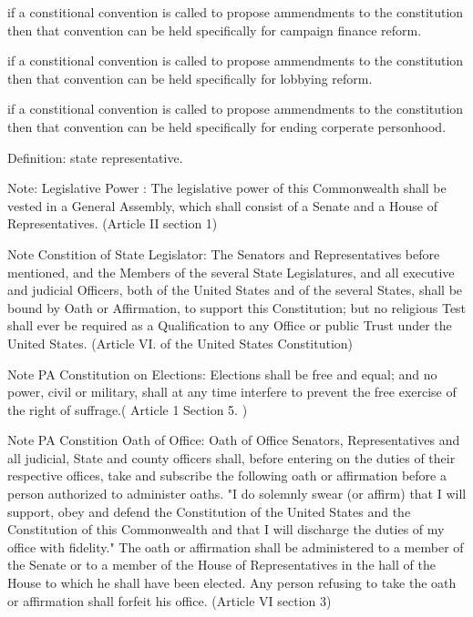 \documentclass[11pt]{article} %
\begin{document}
\begin{enumerate}
if a constitional convention is called to propose ammendments to the constitution then that convention can be held specifically for campaign finance reform.

if a constitional convention is called to propose ammendments to the constitution then that convention can be held specifically for lobbying reform.

if a constitional convention is called to propose ammendments to the constitution then that convention can be held specifically for ending corperate personhood.

Definition:  state representative.

Note: Legislative Power : The legislative power of this Commonwealth shall be vested in a General Assembly, which shall consist of a Senate and a House of Representatives. (Article II section 1)

Note Constition of State Legislator: The Senators and Representatives before mentioned, and the Members of the several State Legislatures, and all executive and judicial Officers, both of the United States and of the several States, shall be bound by Oath or Affirmation, to support this Constitution; but no religious Test shall ever be required as a Qualification to any Office or public Trust under the United States. (Article VI. of the United States Constitution)

Note PA Constitution on Elections: Elections shall be free and equal; and no power, civil or military, shall at any time interfere to prevent the free exercise of the right of suffrage.( Article 1 Section 5. )

Note PA Constition Oath of Office: Oath of Office  Senators, Representatives and all judicial, State and county officers shall, before entering on the duties of their respective offices, take and subscribe the following oath or affirmation before a person authorized to administer oaths. "I do solemnly swear (or affirm) that I will support, obey and defend the Constitution of the United States and the Constitution of this Commonwealth and that I will discharge the duties of my office with fidelity." The oath or affirmation shall be administered to a member of the Senate or to a member of the House of Representatives in the hall of the House to which he shall have been elected. Any person refusing to take the oath or affirmation shall forfeit his office. (Article VI section 3)

\end{enumerate}
\end{document}
